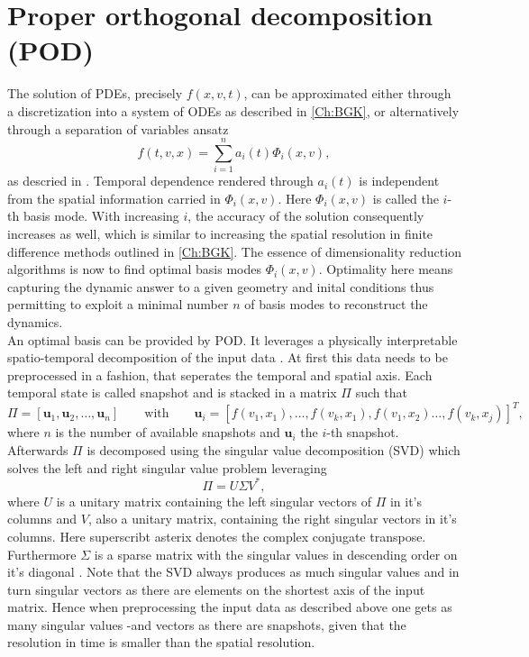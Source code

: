 \section{Proper orthogonal decomposition (POD)}
\label{Sec: POD}
The solution of PDEs, precisely \(f(x,v,t)\), can be approximated either through a discretization into a system of ODEs as described in \cref{Ch:BGK}, or alternatively through a separation of variables ansatz
\begin{equation}
	f(t,v,x) = \sum_{i=1}^n a_i(t)\Phi_i(x,v)\mathrm{,}
\end{equation}  
as descried in \cite{Kutz}. Temporal dependence rendered through \(a_i(t)\) is independent from the spatial information carried in \(\Phi_i(x,v)\). Here \(\Phi_i(x,v)\) is called the \(i\)-th basis mode. With increasing \(i\), the accuracy of the solution consequently increases as well, which is similar to increasing the spatial resolution in finite difference methods outlined in \cref{Ch:BGK}. The essence of dimensionality reduction algorithms is now to find optimal basis modes \(\Phi_i(x,v)\). Optimality here means capturing the dynamic answer to a given geometry and inital conditions thus permitting to exploit a minimal number \(n\) of basis modes to reconstruct the dynamics.\\
An optimal basis can be provided by POD. It leverages a physically interpretable spatio-temporal decomposition of the input data \cite{Kutz}. At first this data needs to be preprocessed in a fashion, that seperates the temporal and spatial axis. Each temporal state is called snapshot and is stacked in a matrix \(\Pi\) such that
\begin{equation}
	\Pi=\left[ \mathbf{u}_1,\mathbf{u}_2,\dots,\mathbf{u}_n \right] \qquad \mathrm{with}\qquad \mathbf{u}_i=\left[f(v_1,x_1),\dots,f(v_k,x_1),f(v_1,x_2)\dots,f(v_k,x_j)\right]^T \mathrm{,}
	\label{Eq:PiPOD}
\end{equation}
where \(n\) is the number of available snapshots and \(\mathbf{u}_i\) the \(i\)-th snapshot. Afterwards \(\Pi\) is decomposed using the singular value decomposition (SVD) which solves the left and right singular value problem leveraging
\begin{equation}
\Pi = U\Sigma V^*\mathrm{,}
\end{equation}
where \(U\) is a unitary matrix containing the left singular vectors of \(\Pi\) in it's columns and \(V\), also a unitary matrix, containing the right singular vectors in it's columns. Here superscribt asterix denotes the complex conjugate transpose. Furthermore \(\Sigma\) is a sparse matrix with the singular values in descending order on it's diagonal \cite{Kutz}. Note that the SVD always produces as much singular values and in turn singular vectors as there are elements on the shortest axis of the input matrix. Hence when preprocessing the input data as described above one gets as many singular values -and vectors as there are snapshots, given that the resolution in time is smaller than the spatial resolution.\\
